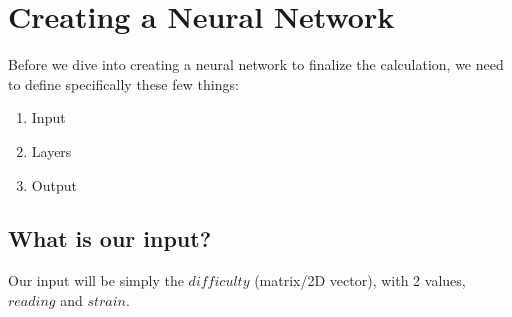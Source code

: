 

\section{Creating a Neural Network}

Before we dive into creating a neural network to finalize the calculation, we need to define specifically these few things:

\begin{enumerate}
	\item Input
	\item Layers
	\item Output
\end{enumerate}

\subsection{What is our input?}

Our input will be simply the $difficulty$ (matrix/2D vector), with 2 values, $reading$ and $strain$.


